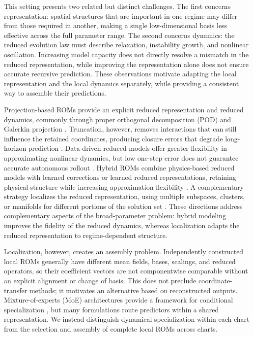 \documentclass{article}
\begin{document}
This setting presents two related but distinct challenges. The first concerns representation: spatial structures that are important in one regime may differ from those required in another, making a single low-dimensional basis less effective across the full parameter range. The second concerns dynamics: the reduced evolution law must describe relaxation, instability growth, and nonlinear oscillation. Increasing model capacity does not directly resolve a mismatch in the reduced representation, while improving the representation alone does not ensure accurate recursive prediction. These observations motivate adapting the local representation and the local dynamics separately, while providing a consistent way to assemble their predictions.

Projection-based ROMs provide an explicit reduced representation and reduced dynamics, commonly through proper orthogonal decomposition (POD) and
Galerkin projection \citep{sirovich1987,berkooz1993,benner2015}. Truncation, however, removes interactions that can still influence the retained coordinates, producing closure errors that degrade long-horizon prediction \citep{amsallem2012}. Data-driven reduced models offer greater flexibility in approximating nonlinear dynamics, but low one-step error does not guarantee accurate autonomous rollout \citep{vlachas2018,duraisamy2019,brunton2020}. Hybrid ROMs combine physics-based reduced models with learned corrections or learned reduced representations, retaining physical structure while increasing approximation flexibility
\citep{dar2023,lee2020,fresca2022,geelen2023}. A complementary strategy localizes the reduced representation, using multiple subspaces, clusters, or manifolds for different portions of the solution set \citep{kaiser2014,li2021cluster,diaz2024}. These directions address complementary aspects of the broad-parameter problem: hybrid modeling improves the fidelity of the reduced dynamics, whereas localization adapts the reduced representation to regime-dependent structure.

Localization, however, creates an assembly problem. Independently constructed local ROMs generally have different mean fields, bases, scalings, and reduced operators, so their coefficient vectors are not componentwise comparable without an explicit alignment or change of basis. This does not preclude coordinate-transfer methods; it motivates an alternative based on reconstructed outputs. Mixture-of-experts (MoE) architectures provide a framework for conditional specialization \citep{jacobs1991,jordan1994,shazeer2017,fedus2022}, but many formulations route predictors within a shared representation. We instead distinguish dynamical specialization within each chart from the selection and assembly of complete local ROMs across charts.
\end{document}
